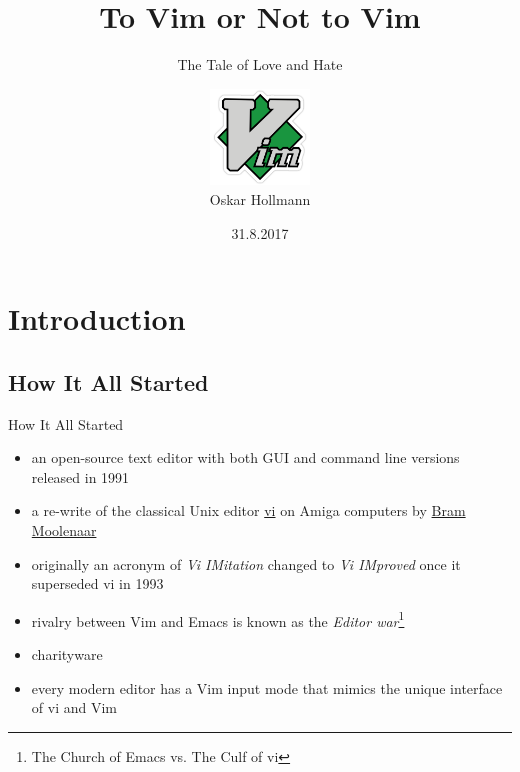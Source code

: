 \documentclass[xcolor=x11names,compress,t]{beamer}
\title{To Vim or Not to Vim}
\subtitle{The Tale of Love and Hate}
\author[Oskar Hollmann]{\vspace{0.3em}\includegraphics[width=0.2\textwidth]{vim-logo}\\Oskar Hollmann}
\institute{U+Python}
\date{31.8.2017}
\renewcommand{\(}{\begin{columns}[T]}
\renewcommand{\)}{\end{columns}}
\newcommand{\<}[1]{\begin{column}{#1}}
\renewcommand{\>}{\end{column}}
\newenvironment{slide}[1]{\subsection{#1} \begin{frame}{#1}}{\end{frame}}
\begin{document}
\maketitle


\section{Introduction}
\begin{slide}{How It All Started}
    \begin{itemize} 
        \item an open-source text editor with both GUI and command line versions released in 1991
        \item a re-write of the classical Unix editor \href{https://en.wikipedia.org/wiki/Vi}{vi} on Amiga computers by \href{https://en.wikipedia.org/wiki/Bram_Moolenaar}{Bram Moolenaar}
        \item originally an acronym of \emph{Vi IMitation} changed to \emph{Vi IMproved} once it superseded vi in 1993
        \item rivalry between Vim and Emacs is known as the \emph{Editor war}\footnote{The Church of Emacs vs. The Culf of vi}
        \item charityware
        \item every modern editor has a Vim input mode that mimics the unique interface of vi and Vim 
    \end{itemize}
\end{slide}
\end{document}
